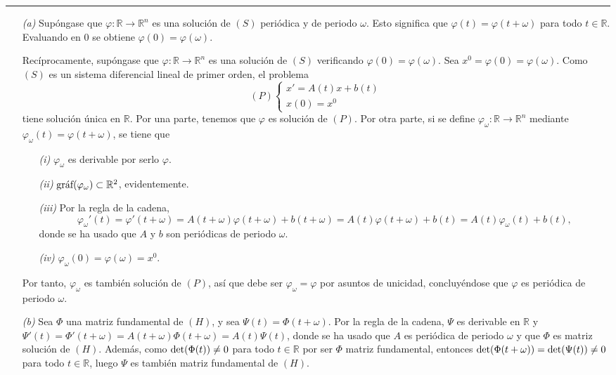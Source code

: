 \documentclass[11pt]{report}
\newcommand{\R}{\mathbb R}
\begin{document}
\vspace{2mm}

\hrule

\vspace{4mm}

\begin{itemize}
    \item[\textit{(a)}] Supóngase que $\varphi \colon \R \to \R^n$ es una solución de $(S)$ periódica y de periodo $\omega$. Esto significa que $\varphi(t)=\varphi(t+\omega)$ para todo $t \in \R$. Evaluando en 0 se obtiene $\varphi(0)=\varphi(\omega)$.

    \vspace{2mm}

    Recíprocamente, supóngase que $\varphi \colon \R \to \R^n$ es una solución de $(S)$ verificando $\varphi(0)=\varphi(\omega)$. Sea $x^0=\varphi(0)=\varphi(\omega)$. Como $(S)$ es un sistema diferencial lineal de primer orden, el problema
    \[(P) \begin{cases}
        x'=A(t)x+b(t) \\
        x(0)=x^0
    \end{cases}\]
    tiene solución única en $\R$. Por una parte, tenemos que $\varphi$ es solución de $(P)$. Por otra parte, si se define $\varphi_\omega \colon \R \to \R^n$ mediante $\varphi_\omega(t) = \varphi(t+\omega)$, se tiene que
    \begin{itemize}
        \item[\textit{(i)}] $\varphi_\omega$ es derivable por serlo $\varphi$.
        \item[\textit{(ii)}] $\textup{gráf}(\varphi_{\omega}) \subset \R^2$, evidentemente.
        \item[\textit{(iii)}] Por la regla de la cadena, \[\varphi_\omega'(t) = \varphi'(t+\omega)=A(t+\omega)\varphi(t+\omega)+b(t+\omega)=A(t)\varphi(t+\omega)+b(t)=A(t)\varphi_\omega(t)+b(t),\] donde se ha usado que $A$ y $b$ son periódicas de periodo $\omega$.
        \item[\textit{(iv)}] $\varphi_\omega(0) = \varphi(\omega)=x^0$.
    \end{itemize}
    Por tanto, $\varphi_\omega$ es también solución de $(P)$, así que debe ser $\varphi_\omega = \varphi$ por asuntos de unicidad, concluyéndose que $\varphi$ es periódica de periodo $\omega$.
    \item[\textit{(b)}] Sea $\Phi$ una matriz fundamental de $(H)$, y sea $\Psi(t) = \Phi(t+\omega)$. Por la regla de la cadena, $\Psi$ es derivable en $\R$ y $\Psi'(t) = \Phi'(t+\omega) = A(t+\omega)\Phi(t+\omega) = A(t)\Psi(t)$, donde se ha usado que $A$ es periódica de periodo $\omega$ y que $\Phi$ es matriz solución de $(H)$. Además, como $\textup{det}(\Phi(t)) \neq 0$ para todo $t \in \R$ por ser $\Phi$ matriz fundamental, entonces $\textup{det}(\Phi(t+\omega))=\textup{det}(\Psi(t)) \neq 0$ para todo $t \in \R$, luego $\Psi$ es también matriz fundamental de $(H)$.

\end{itemize}
\end{document}
